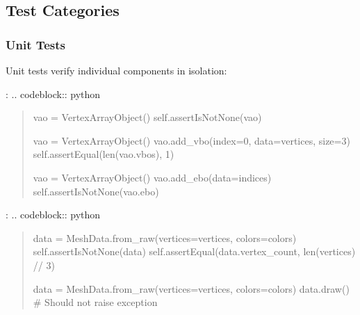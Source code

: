 \documentclass[a4paper,10pt,english,openany,oneside]{sphinxmanual}
\begin{document}
\subsection{Test Categories}
\label{\detokenize{testing:test-categories}}

\subsubsection{Unit Tests}
\label{\detokenize{testing:unit-tests}}
\sphinxAtStartPar
Unit tests verify individual components in isolation:

\sphinxAtStartPar
{}:
.. code\sphinxhyphen{}block:: python
\begin{quote}
\begin{description}
\begin{description}
\sphinxAtStartPar
vao = VertexArrayObject()
self.assertIsNotNone(vao)

\sphinxAtStartPar
vao = VertexArrayObject()
vao.add\_vbo(index=0, data=vertices, size=3)
self.assertEqual(len(vao.vbos), 1)

\sphinxAtStartPar
vao = VertexArrayObject()
vao.add\_ebo(data=indices)
self.assertIsNotNone(vao.ebo)

\end{description}

\end{description}
\end{quote}

\sphinxAtStartPar
{}:
.. code\sphinxhyphen{}block:: python
\begin{quote}
\begin{description}
\begin{description}
\sphinxAtStartPar
data = MeshData.from\_raw(vertices=vertices, colors=colors)
self.assertIsNotNone(data)
self.assertEqual(data.vertex\_count, len(vertices) // 3)

\sphinxAtStartPar
data = MeshData.from\_raw(vertices=vertices, colors=colors)
data.draw()  \# Should not raise exception

\end{description}

\end{description}
\end{quote}
\end{document}
